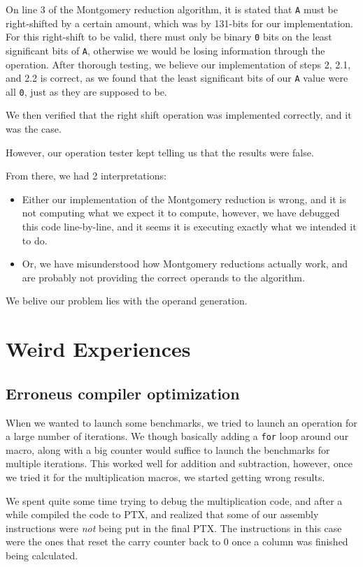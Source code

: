 \documentclass[12pt, a4paper]{report}
\begin{document}
On line 3 of the Montgomery reduction algorithm, it is stated that \verb+A+ must be
right-shifted by a certain amount, which was by 131-bits for our implementation.
For this right-shift to be valid, there must only be binary \verb+0+ bits on the least
significant bits of \verb+A+, otherwise we would be losing information through
the operation.
After thorough testing, we believe our implementation of steps
2, 2.1, and 2.2 is correct, as we found that the least significant bits of our
\verb+A+ value were all \verb+0+, just as they are supposed to be.

We then verified that the right shift operation was implemented correctly, and it was the case.

However, our operation tester kept telling us that the results were false.

From there, we had 2 interpretations:
\begin{itemize}
\item Either our implementation of the Montgomery reduction is wrong, and it is not computing
what we expect it to compute, however, we have debugged this code line-by-line,
and it seems it is executing exactly what we intended it to do.

\item Or, we have misunderstood how Montgomery reductions
actually work, and are probably not providing the correct operands to the algorithm.
\end{itemize}

We belive our problem lies with the operand generation.

\section{Weird Experiences}
\subsection{Erroneus compiler optimization}
When we wanted to launch some benchmarks, we tried to launch an operation for a
large number of iterations.
We though basically adding a \verb+for+ loop around our macro, along with a big
counter would suffice to launch the benchmarks for multiple iterations.
This worked well for addition and subtraction, however, once we tried it for
the multiplication macros, we started getting wrong results.

We spent quite some time trying to debug the multiplication code, and after a while
compiled the code to PTX, and realized that some of our assembly instructions were
\emph{not} being put in the final PTX.
The instructions in this case were the ones that reset the carry counter back to 0
once a column was finished being calculated.
\end{document}
